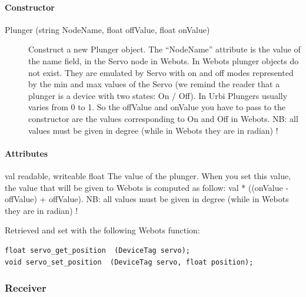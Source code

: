 \paragraph{Constructor}
\label{webots.uobjects.robotdevices.plunger.constructor}%

\noindent
\begin{description}
\item[{Plunger (string NodeName, float offValue, float onValue)}]
  Construct a new Plunger object. The ``NodeName'' attribute is the
  value of the name field, in the Servo node in Webots. In Webots
  plunger objects do not exist. They are emulated by Servo with on and
  off modes represented by the min and max values of the Servo (we
  remind the reader that a plunger is a device with two states: On /
  Off). In Urbi Plungers usually varies from 0 to 1. So the offValue
  and onValue you have to pass to the constructor are the values
  corresponding to On and Off in Webots. NB: all values must be given
  in degree (while in Webots they are in radian) !

\end{description}

\paragraph{Attributes}
\label{webots.uobjects.robotdevices.plunger.attributes}%

\noindent
\begin{itemize}
\begin{attribute}{val}
  {readable, writeable}
  {float}
  {}
  The value of the plunger. When you set this value, the
 value that will be given to Webots is computed as follow: val *
 ((onValue -{} offValue) + offValue).  NB: all values must be given in
 degree (while in Webots they are in radian) !


          Retrieved and set with the following Webots function:


\begin{lstlisting}
float servo_get_position  (DeviceTag servo);
void servo_set_position  (DeviceTag servo, float position);
\end{lstlisting}
\end{attribute}

\end{itemize}

\subsubsection{Receiver}
\label{webots.uobjects.robotdevices.receiver}%

